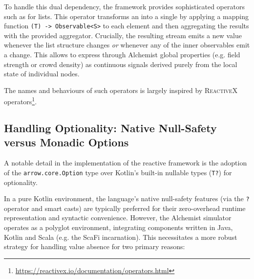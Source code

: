 To handle this dual dependency, the framework provides sophisticated operators
such as  for lists. This operator transforms an
\linebreak{} into a single
 by applying a mapping function \linebreak\texttt{(T) -> Observable<S>} to each element and then aggregating the results with the
provided aggregator. Crucially, the resulting stream emits a new value whenever
the list structure changes \emph{or} whenever any of the inner observables emit
a change. This allows to express through Alchemist global properties (e.g.
field strength or crowd density) as continuous signals derived purely from the
local state of individual nodes.

The names and behaviours of such operators is largely inspired by
\textsc{ReactiveX}
operators\footnote{\url{https://reactivex.io/documentation/operators.html}}.

\subsection{Handling Optionality: Native Null-Safety versus Monadic Options}
A notable detail in the implementation of the reactive framework is the
adoption of the \texttt{arrow.core.Option} type over Kotlin's built-in nullable
types (\texttt{T?}) for optionality.

In a pure Kotlin environment, the language's native null-safety features (via
the \texttt{?} operator and smart casts) are typically preferred for their
zero-overhead runtime representation and syntactic convenience. However, the
Alchemist simulator operates as a polyglot environment, integrating components
written in Java, Kotlin and Scala (e.g. the ScaFi incarnation). This
necessitates a more robust strategy for handling value absence for two primary
reasons:

